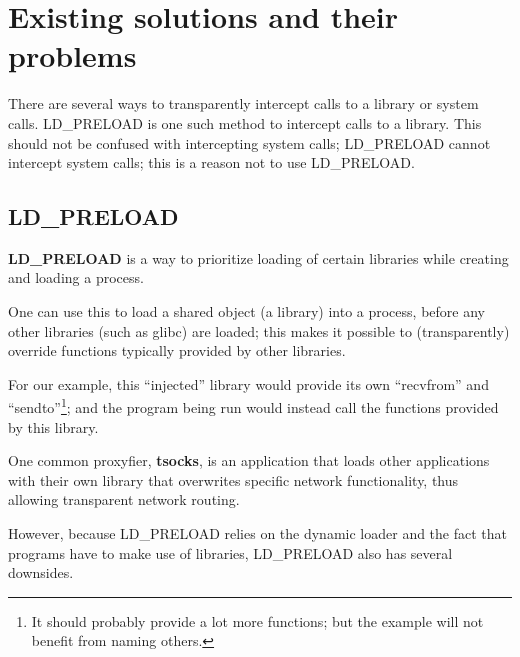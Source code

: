 \documentclass[a4paper, 10pt]{report}
\begin{document}


%

\section{Existing solutions and their problems}

There are several ways to transparently intercept calls to a library or
system calls. LD\_PRELOAD is one such method to intercept calls to a library.
This should not be confused with intercepting system calls; LD\_PRELOAD
cannot intercept system calls; this is a reason not to use LD\_PRELOAD.

\subsection{LD\_PRELOAD}

\textbf{LD\_PRELOAD} is a way to prioritize loading of certain libraries
while creating and loading a process.

One can use this to load a shared object (a library) into a process,
before any other libraries (such as glibc) are loaded;
this makes it possible to (transparently) override functions typically
provided by other libraries.

For our example, this ``injected'' library would provide its own
``recvfrom'' and ``sendto''\footnote{It should probably provide
a lot more functions; but the example will not benefit from naming others.};
and the program being run would instead call the functions provided by
this library.

One common proxyfier, \textbf{tsocks}, is an application that loads
other applications with their own library that overwrites specific
network functionality, thus allowing transparent network routing.

However, because LD\_PRELOAD relies on the dynamic loader and the fact that
programs have to make use of libraries, LD\_PRELOAD also has several downsides.
\end{document}

